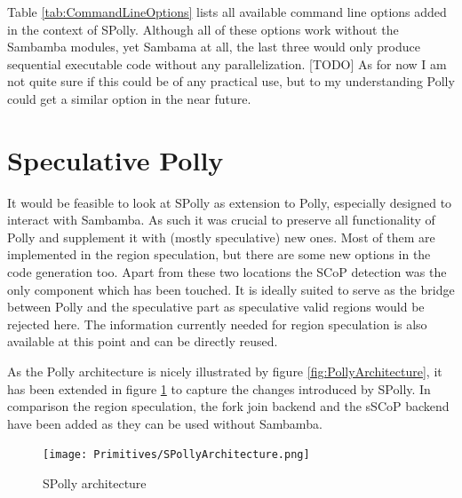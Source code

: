 \begin{shaded}
Table \ref{tab:CommandLineOptions} lists all available command line options 
added in the context of SPolly. Although all of these options work 
without the Sambamba modules, yet Sambama at all, the last three would only 
produce sequential executable code without any parallelization. 
[TODO] As for now I am not quite sure if this could be of any practical use, 
but to my understanding Polly could get a similar option in the near future. 





\section{Speculative Polly}
It would be feasible to look at SPolly as extension to Polly, especially designed
to interact with Sambamba. As such it was crucial to preserve all functionality 
of Polly and supplement it with (mostly speculative) new ones. Most of them are
implemented in the region speculation, but there are some new options in the 
code generation too. Apart from these two locations the SCoP detection was the 
only component which has been touched. It is ideally suited to serve as the 
bridge between Polly and the speculative part as speculative valid regions 
would be rejected here. The information currently needed for region speculation
is also available at this point and can be directly reused.

As the Polly architecture is nicely illustrated by figure 
\ref{fig:PollyArchitecture}, it has been extended in figure 
\ref{fig:SPollyArchitecture} to capture the changes introduced by SPolly. 
In comparison the region speculation, the fork join backend and the sSCoP
backend have been added as they can be used without Sambamba. 
\end{shaded}

\begin{figure}[htbp]
  \centering
  \texttt{[image: Primitives/SPollyArchitecture.png]}
  \caption{SPolly architecture}
  \label{fig:SPollyArchitecture}  
\end{figure}

